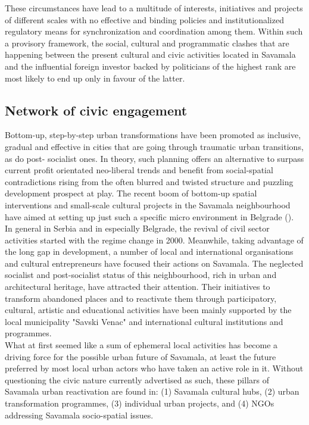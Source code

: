 \documentclass[11pt]{report}
\begin{document}
These circumstances have lead to a multitude of interests, initiatives and projects of different scales with no effective and binding policies and institutionalized regulatory means for synchronization and coordination among them. Within such a provisory framework, the social, cultural and programmatic clashes that are happening between the present cultural and civic activities located in Savamala and the influential foreign investor backed by politicians of the highest rank are most likely to end up only in favour of the latter.

\subsection{Network of civic engagement}

Bottom-up, step-by-step urban transformations have been promoted as inclusive, gradual and effective in cities that are going through traumatic urban transitions, as do post- socialist ones. In theory, such planning offers an alternative to surpass current profit orientated
neo-liberal trends and benefit from social-spatial contradictions rising from the often blurred and twisted structure and puzzling development prospect at play. The recent boom of bottom-up spatial interventions and small-scale cultural projects in the Savamala neighbourhood have aimed at setting up just such a specific micro environment in Belgrade (\href{Urban Incubator}{\citealt{muller-wieferig_urban_2013}}).
\\

In general in Serbia and in especially Belgrade, the revival of civil sector activities started with the regime change in 2000. Meanwhile, taking advantage of the long gap in development, a number of local and international organisations and cultural entrepreneurs have focused their actions on Savamala. The neglected socialist and post-socialist status of this neighbourhood, rich in urban and architectural heritage, have attracted their attention. Their initiatives to transform abandoned places and to reactivate them through participatory, cultural, artistic and educational activities have been mainly supported by the local municipality  "Savski Venac" and international cultural institutions and programmes.
\\

What at first seemed like a sum of ephemeral local activities has become a driving force for the possible urban future of Savamala, at least the future preferred by most local urban actors who have taken an active role in it.
Without questioning the civic nature currently advertised as such, these pillars of Savamala urban reactivation are found in:
(1) Savamala cultural hubs,
(2) urban transformation programmes,
(3) individual urban projects, 
and
(4) NGOs addressing Savamala socio-spatial issues.
\\
\end{document}
